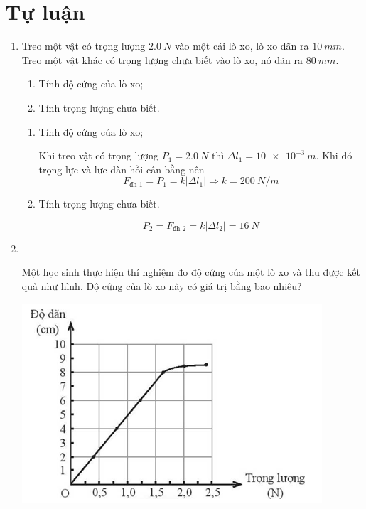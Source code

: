 \section{Tự luận}
\begin{enumerate}[label=\bfseries Câu \arabic*:]
	\item {}
	
	
	{
		Treo một vật có trọng lượng $\SI{2.0}{N}$ vào một cái lò xo, lò xo dãn ra $\SI{10}{mm}$. Treo một vật khác có trọng lượng chưa biết vào lò xo, nó dãn ra $\SI{80}{mm}$.
		\begin{enumerate}[label=\alph*)]
			\item Tính độ cứng của lò xo;
			\item Tính trọng lượng chưa biết.
		\end{enumerate}
	}
	
	\hideall
	{	
		\begin{enumerate}[label=\alph*)]
			\item Tính độ cứng của lò xo;
			
			Khi treo vật có trọng lượng $P_1=\SI{2.0}{N}$ thì $\Delta l_1 = \SI{10e-3}{m}$. Khi đó trọng lực và lưc đàn hồi cân bằng nên
			$$F_\text{đh 1} = P_1 = k |\Delta l_1| \Rightarrow k = \SI{200}{N/m}$$
			
			\item Tính trọng lượng chưa biết.
			
			$$P_2 = F_\text{đh 2} =k |\Delta l_2| = \SI{16}{N} $$
		\end{enumerate}
	}
	
	\item{}\\
	{Một học sinh thực hiện thí nghiệm đo độ cứng của một lò xo và thu được kết quả như hình. Độ cứng của lò xo này có giá trị bằng bao nhiêu?
		\begin{center}
			\includegraphics[width=0.4\linewidth]{../figs/VN10-2023-PH-TP033-4}
		\end{center}
	
}
	

\end{enumerate}
